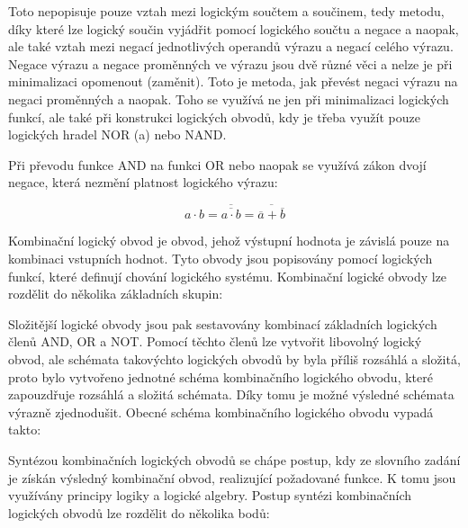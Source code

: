 {Toto nepopisuje pouze vztah mezi logickým součtem a součinem, tedy metodu, díky které lze logický součin vyjádřit pomocí logického součtu a negace a naopak, ale také vztah mezi negací jednotlivých operandů výrazu a negací celého výrazu. Negace výrazu a negace proměnných ve výrazu jsou dvě různé věci a nelze je při minimalizaci opomenout (zaměnit). Toto je metoda, jak převést negaci výrazu na negaci proměnných a naopak.
Toho se využívá ne jen při minimalizaci logických funkcí, ale také při konstrukci logických obvodů, kdy je třeba využít pouze logických hradel NOR (a) nebo NAND. 

Při převodu funkce AND na funkci OR nebo naopak se využívá zákon dvojí negace, která nezmění platnost logického výrazu:

$$ a \cdot b  = \overline{\overline{a \cdot b}} = \overline{\overline{a}+\overline{b}}$$


Kombinační logický obvod je obvod, jehož výstupní hodnota je závislá pouze na kombinaci vstupních hodnot. Tyto obvody jsou popisovány pomocí logických funkcí, které definují chování logického systému. Kombinační logické obvody lze rozdělit do několika základních skupin:


Složitější logické obvody jsou pak sestavovány kombinací základních logických členů AND, OR a NOT. Pomocí těchto členů lze vytvořit libovolný logický obvod, ale schémata takovýchto logických obvodů by byla příliš rozsáhlá a složitá, proto bylo vytvořeno jednotné schéma kombinačního logického obvodu, které zapouzdřuje rozsáhlá a složitá schémata. Díky tomu je možné výsledné schémata výrazně zjednodušit. Obecné schéma kombinačního logického obvodu vypadá takto:

\vskip 4mm
\centerline{}
\vskip 4mm


Syntézou kombinačních logických obvodů se chápe postup, kdy ze slovního zadání je získán výsledný kombinační obvod, realizující požadované funkce. K tomu jsou využívány principy logiky a logické algebry. Postup syntézi kombinačních logických obvodů lze rozdělit do několika bodů:


}
